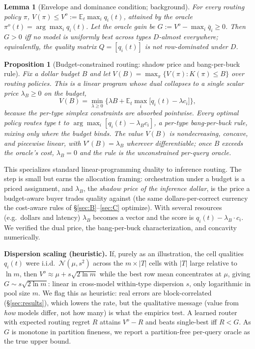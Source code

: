 \documentclass[11pt]{article}
\theoremstyle{plain}
\newtheorem{proposition}{Proposition}
\newtheorem{lemma}{Lemma}
\theoremstyle{definition}
\newcommand{\E}{\mathbb{E}}
\begin{document}
\begin{lemma}[Envelope and dominance condition; background]\label{lem:env}
For every routing policy $\pi$, $V(\pi)\le V^o:=\E_t\max_i q_i(t)$, attained by the oracle $\pi^o(t)=\arg\max_i q_i(t)$.
Let the oracle gain be $G:=V^o-\max_i\bar q_i\ge 0$. Then $G>0$ iff no model is uniformly best across types
$D$-almost everywhere; equivalently, the quality matrix $Q=[q_i(t)]$ is not row-dominated under $D$.
\end{lemma}

\begin{proposition}[Budget-constrained routing: shadow price and bang-per-buck rule]\label{prop:duality}
Fix a dollar budget $B$ and let $V(B)=\max_{\pi}\{V(\pi):K(\pi)\le B\}$ over routing policies. This is a linear program
whose dual collapses to a \emph{single scalar} price $\lambda_B\ge0$ on the budget,
\[ V(B)=\min_{\lambda\ge0}\Big\{\lambda B+\E_t\max_i\big[q_i(t)-\lambda c_i\big]\Big\}, \]
because the per-type simplex constraints are absorbed pointwise. Every optimal policy routes type $t$ to
$\arg\max_i[q_i(t)-\lambda_B c_i]$, a per-type \emph{bang-per-buck} rule, mixing only where the budget binds. The value
$V(B)$ is nondecreasing, concave, and piecewise linear, with $V'(B)=\lambda_B$ wherever differentiable; once $B$ exceeds
the oracle's cost, $\lambda_B=0$ and the rule is the unconstrained per-query oracle.
\end{proposition}
\noindent This specializes standard linear-programming duality \citep{bertsimas1997lp} to inference routing. The step
is small but earns the allocation framing: orchestration under a budget is a priced assignment, and $\lambda_B$, the
\emph{shadow price of the inference dollar}, is the price a budget-aware buyer trades quality against (the same dollars-per-correct
currency the cost-aware rules of \S\ref{sec:B}--\ref{sec:C} optimize). With several resources (e.g.\ dollars and latency) $\lambda_B$ becomes a vector and the score is
$q_i(t)-\lambda_B\!\cdot c_i$. We verified the dual price, the bang-per-buck characterization, and concavity numerically.

\noindent\textbf{Dispersion scaling (heuristic).} If, purely as an illustration, the cell qualities $q_i(t)$ were i.i.d.\
$\mathcal N(\mu,s^2)$ across the $m\times|T|$ cells with $|T|$ large relative to $\ln m$, then $V^o\approx\mu+s\sqrt{2\ln m}$
while the best row mean concentrates at $\mu$, giving $G\sim s\sqrt{2\ln m}$: linear in cross-model within-type dispersion
$s$, only logarithmic in pool size $m$. We flag this as heuristic: real errors are block-correlated (\S\ref{sec:results}),
which lowers the rate, but the qualitative message (value from \emph{how} models differ, not how many) is what the
empirics test. A learned router with expected routing regret $R$ attains $V^o-R$ and beats single-best iff $R<G$. As $G$
is monotone in partition fineness, we report a partition-free per-query oracle as the true upper bound.
\end{document}
